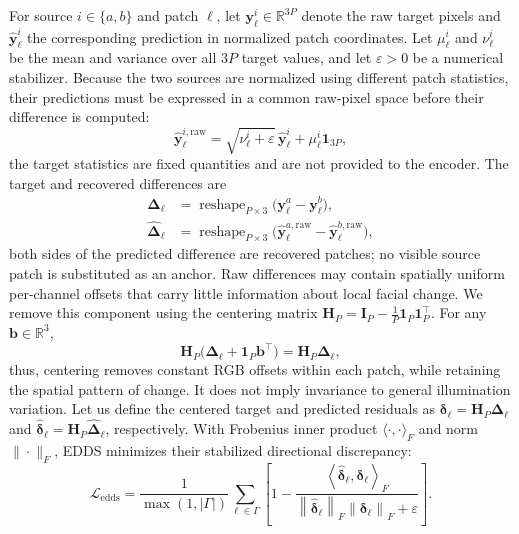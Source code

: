 \documentclass[10pt,journal,compsoc]{IEEEtran}
\begin{document}
For source $i\in\{a,b\}$ and patch $\ell$, let $\mathbf{y}^{i}_{\ell}\in\mathbb{R}^{3P}$ denote the raw target pixels and $\hat{\mathbf{y}}^{i}_{\ell}$ the corresponding prediction in normalized patch coordinates. Let $\mu^{i}_{\ell}$ and $\nu^{i}_{\ell}$ be the mean and variance over all $3P$ target values, and let $\varepsilon>0$ be a numerical stabilizer. Because the two sources are normalized using different patch statistics, their predictions must be expressed in a common raw-pixel space before their difference is computed:
\begin{equation}
\hat{\mathbf{y}}^{i,\mathrm{raw}}_{\ell}
=
\sqrt{\nu^{i}_{\ell}+\varepsilon}\,
\hat{\mathbf{y}}^{i}_{\ell}
+
\mu^{i}_{\ell}\mathbf{1}_{3P},
\label{eq:dime_inverse_normalization}
\end{equation}
the target statistics are fixed quantities and are not provided to the encoder. The target and recovered differences are
\begin{equation}
\begin{aligned}
\boldsymbol{\Delta}_{\ell}
&=
\operatorname{reshape}_{P\times 3}
\bigl(\mathbf{y}^{a}_{\ell}-\mathbf{y}^{b}_{\ell}\bigr),\\
\hat{\boldsymbol{\Delta}}_{\ell}
&=
\operatorname{reshape}_{P\times 3}
\bigl(\hat{\mathbf{y}}^{a,\mathrm{raw}}_{\ell}
-\hat{\mathbf{y}}^{b,\mathrm{raw}}_{\ell}\bigr),
\end{aligned}
\label{eq:dime_pairwise_difference}
\end{equation}
both sides of the predicted difference are recovered patches; no visible source patch is substituted as an anchor. Raw differences may contain spatially uniform per-channel offsets that carry little information about local facial change. We remove this component using the centering matrix $\mathbf{H}_{P}=\mathbf{I}_{P} -\tfrac{1}{P}\mathbf{1}_{P}\mathbf{1}_{P}^{\top}$. For any $\mathbf{b}\in\mathbb{R}^{3}$,
\begin{equation}
\mathbf{H}_{P}
\bigl(\boldsymbol{\Delta}_{\ell}
+\mathbf{1}_{P}\mathbf{b}^{\top}\bigr)
=
\mathbf{H}_{P}\boldsymbol{\Delta}_{\ell},
\label{eq:dime_dc_invariance}
\end{equation}
thus, centering removes constant RGB offsets within each patch, while retaining the spatial pattern of change. It does not imply invariance to general illumination variation. Let us define the centered target and predicted residuals as
$\boldsymbol{\delta}_{\ell}
=\mathbf{H}_{P}\boldsymbol{\Delta}_{\ell}$ and
$\hat{\boldsymbol{\delta}}_{\ell}
=\mathbf{H}_{P}\hat{\boldsymbol{\Delta}}_{\ell}$, respectively. With Frobenius inner product $\langle\cdot,\cdot\rangle_F$ and norm $\|\cdot\|_F$, EDDS minimizes their stabilized directional discrepancy:
\begin{equation}
\mathcal{L}_{\mathrm{edds}}
=
\frac{1}{\max(1,|\Gamma|)}
\sum_{\ell\in\Gamma}
\left[
1-
\frac{
\left\langle
\hat{\boldsymbol{\delta}}_{\ell},
\boldsymbol{\delta}_{\ell}
\right\rangle_F
}{
\left\|\hat{\boldsymbol{\delta}}_{\ell}\right\|_F
\left\|\boldsymbol{\delta}_{\ell}\right\|_F
+\varepsilon
}
\right].
\label{eq:dime_edds_loss}
\end{equation}
\end{document}
